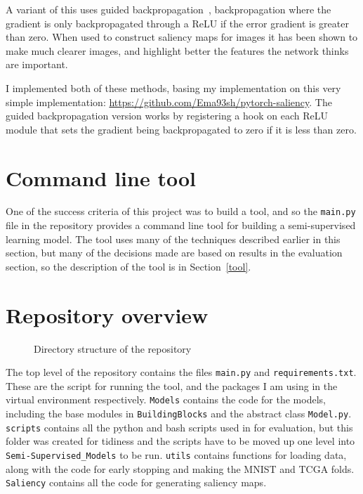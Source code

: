 A variant of this uses guided backpropagation~\cite{DBLP:journals/corr/SpringenbergDBR14}, backpropagation where the 
gradient is only backpropagated through a ReLU if the error gradient is greater than zero. When used to construct saliency maps for 
images it has been shown to make much clearer images, and highlight better the features the network thinks are important.

I implemented both of these methods, basing my implementation on this very simple implementation: \url{https://github.com/Ema93sh/pytorch-saliency}.
The guided backpropagation version works by registering a hook on each ReLU module that sets the gradient being backpropagated 
to zero if it is less than zero.

\section{Command line tool}
One of the success criteria of this project was to build a tool, and so the \texttt{main.py} file in the repository provides a command line tool 
for building a semi-supervised learning model. The tool uses many of the techniques described earlier in this section, but many of the 
decisions made are based on results in the evaluation section, so the description of the tool is in Section~\ref{tool}.

\section{Repository overview}

\begin{figure}[H]
    \centering
    \begin{minipage}{7cm}
    \end{minipage}
    \caption{Directory structure of the repository}
\end{figure}

The top level of the repository contains the files \texttt{main.py} and \texttt{requirements.txt}. These are the script for running the tool,
and the packages I am using in the virtual environment respectively. \texttt{Models} contains the code for the models,
including the base modules in \texttt{BuildingBlocks} and the abstract class \texttt{Model.py}.
\texttt{scripts} contains all the python and bash scripts used in 
for evaluation, but this folder was created for tidiness and the scripts have to be moved up one level into 
\texttt{Semi-Supervised\_Models} to be run. \texttt{utils} contains functions for loading data, along with the code for early stopping and 
making the MNIST and TCGA folds. \texttt{Saliency} contains all the code for generating saliency maps.
